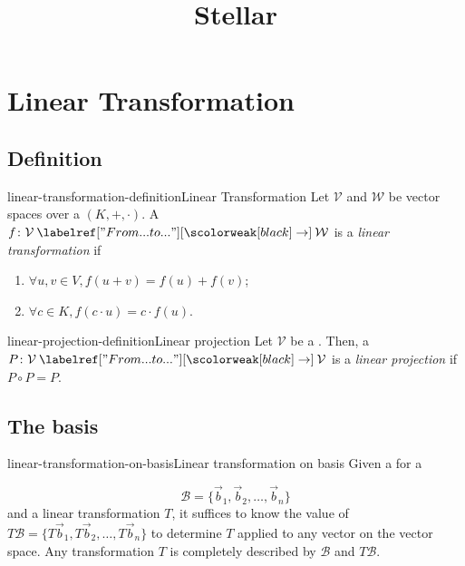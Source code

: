 \documentclass[preview]{standalone}
\begin{document}
\title{Stellar}
\genpage

\section{Linear Transformation}

\subsection{Definition}

\begin{snippetdefinition}{linear-transformation-definition}{Linear Transformation}
    Let \(\mathcal{V}\) and \(\mathcal{W}\) be vector spaces over a \field \((K, +, \cdot)\).
    A \function \(f \colon \mathcal{V} \fromto \mathcal{W}\) is a
    \emph{linear transformation} if
    \begin{enumerate}
        \item \(\forall u,v \in V, f(u + v) = f(u) + f(v)\);
        \item \(\forall c\in K, f(c\cdot u) = c\cdot f(u)\).
    \end{enumerate}
\end{snippetdefinition}

\begin{snippetdefinition}{linear-projection-definition}{Linear projection}
    Let \(\mathcal{V}\) be a \vectorspace. Then,
    a \lineartransformation \(P \colon \mathcal{V} \fromto \mathcal{V}\) is a
    \emph{linear projection} if \(P \circ P = P\).
\end{snippetdefinition}

\subsection{The basis}


\begin{snippettheorem}{linear-transformation-on-basis}{Linear transformation on basis}
    Given a \basis for a \vectorspace

    \[
        \mathcal{B}=\{\vec{b}_1, \vec{b}_2, \ldots, \vec{b}_n\}
    \]
    and a linear transformation \(T\), it suffices
    to know the value of \(T\mathcal{B}=\{T\vec{b}_1, T\vec{b}_2, \ldots, T\vec{b}_n\}\)
    to determine \(T\) applied to any vector on the vector space.
    Any transformation \(T\) is completely described by \(\mathcal{B}\)
    and \(T\mathcal{B}\).
\end{snippettheorem}
\end{document}
